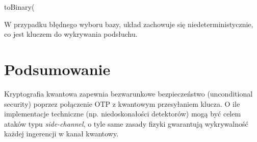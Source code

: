 toBinary(\documentclass{article}
\begin{document}
W przypadku błędnego wyboru bazy, układ zachowuje się niedeterministycznie, co jest kluczem do wykrywania podsłuchu.

\section{Podsumowanie}
Kryptografia kwantowa zapewnia bezwarunkowe bezpieczeństwo (unconditional security) poprzez połączenie OTP z kwantowym przesyłaniem klucza. O ile implementacje techniczne (np. niedoskonałości detektorów) mogą być celem ataków typu \textit{side-channel}, o tyle same zasady fizyki gwarantują wykrywalność każdej ingerencji w kanał kwantowy.
\end{document}
